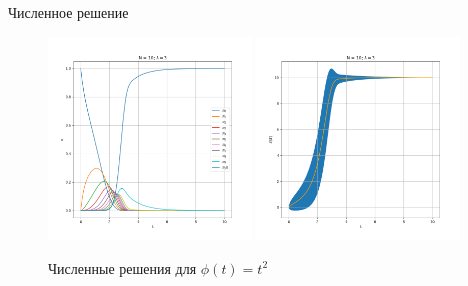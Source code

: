 \begin{frame}{Численное решение}
{			\begin{figure}
				\centering
				\includegraphics[width=0.48\textwidth, keepaspectratio]{../img/numeric_sol/probabilities_N_10_lambda_3_poly.png}
				\includegraphics[width=0.48\textwidth, keepaspectratio]{../img/numeric_sol/avers_N_10_lambda_3_poly.png}
				\caption{Численные решения для $ \phi(t) = t^2 $}
			\end{figure}
		}
		
\end{frame}
